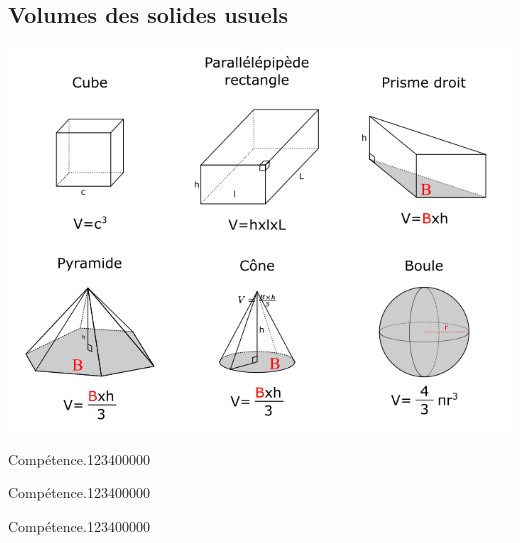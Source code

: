 \begin{pageCours}
\subsection{Volumes des solides usuels}

\begin{center}
\includegraphics[width=.8\linewidth]{FIG/formulaire_volumes.png} 
\end{center}

\end{pageCours} %


\begin{pageAD}  %
\restoregeometry %


\begin{ExoCad}{Compétence.}{1234}{0}{0}{0}{0}{0}

\end{ExoCad}


\begin{ExoCad}{Compétence.}{1234}{0}{0}{0}{0}{0}

\end{ExoCad}


\begin{ExoCad}{Compétence.}{1234}{0}{0}{0}{0}{0}

\end{ExoCad}
 
\end{pageAD} %

